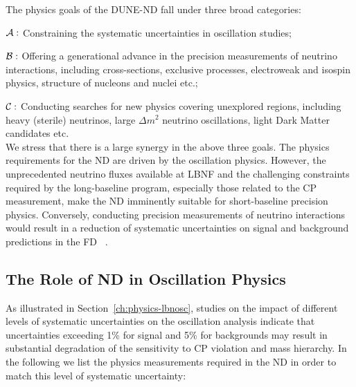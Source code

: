 The physics goals of the DUNE-ND fall under three broad categories: 

\noindent
{\boldmath $ {\cal A:}$} Constraining the systematic uncertainties in  oscillation studies;  

\noindent
{\boldmath $ {\cal B:}$} Offering a generational advance in the precision measurements of neutrino interactions, including 
cross-sections, exclusive processes, electroweak and isospin physics, structure of nucleons and nuclei etc.;  

\noindent
{\boldmath $ {\cal C:}$} Conducting searches for new physics covering unexplored regions, 
including heavy (sterile) neutrinos, large $\Delta m^2$ neutrino oscillations, light Dark Matter 
candidates etc. \\
\noindent
We stress that there is a large synergy in the above three goals. The physics requirements for the ND are driven 
by the oscillation physics. However,  the unprecedented neutrino fluxes available at LBNF and the challenging 
constraints required by the long-baseline program, especially those related to the CP measurement,   make the ND imminently suitable for  short-baseline 
precision physics. Conversely, conducting precision measurements of neutrino 
interactions would result in a reduction of systematic uncertainties on signal and background 
predictions in the FD ~\cite{HIRESMNU, DPR, Adams:2013qkq}. 



\subsection{The Role of ND in Oscillation Physics}  
\label{sec-nd-oscl} 

As illustrated in Section~\ref{ch:physics-lbnosc}, studies on the impact of different levels of systematic 
uncertainties on the oscillation analysis indicate 
that uncertainties exceeding 1\% for signal and 5\% for backgrounds may result in 
substantial degradation of the sensitivity to CP violation and mass hierarchy. 
In the following we list the physics measurements required in the ND in order to 
match this level of systematic uncertainty:   

